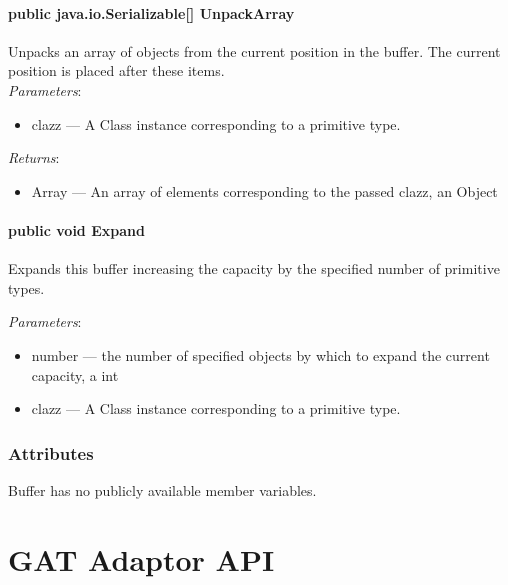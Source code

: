 \documentclass[$Date: 2003/06/26 19:29:31 $]{glabarticle}
\begin{document}
\paragraph{public java.io.Serializable[] UnpackArray}
Unpacks an array of objects from the current position in the buffer. The current
position is placed after these items. \\

\textit{Parameters}:
\begin{itemize}
\item[] clazz --- A Class instance corresponding to a primitive type.  
\end{itemize}

\textit{Returns}:
\begin{itemize}
\item[] Array --- An array of elements corresponding to the passed clazz, an Object
\end{itemize}

\paragraph{public void Expand}

Expands this buffer increasing the capacity by the specified number of primitive types.

\textit{Parameters}:
\begin{itemize}
\item[] number --- the number of specified objects by which to expand the current capacity, a int
\item[] clazz --- A Class instance corresponding to a primitive type.  
\end{itemize}


\subsubsection{Attributes}

Buffer has no publicly available member variables. 


\newpage

\section{GAT Adaptor API}
\label{sec:GAT-Adp}
\end{document}
